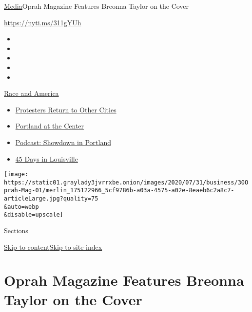 \href{/section/business/media}{Media}\textbar{}Oprah Magazine Features
Breonna Taylor on the Cover

\url{https://nyti.ms/311gYUh}

\begin{itemize}
\item
\item
\item
\item
\item
\end{itemize}

\href{https://www.nytimes3xbfgragh.onion/news-event/george-floyd-protests-minneapolis-new-york-los-angeles?action=click\&pgtype=Article\&state=default\&region=TOP_BANNER\&context=storylines_menu}{Race
and America}

\begin{itemize}
\tightlist
\item
  \href{https://www.nytimes3xbfgragh.onion/2020/07/26/us/protests-portland-seattle-trump.html?action=click\&pgtype=Article\&state=default\&region=TOP_BANNER\&context=storylines_menu}{Protesters
  Return to Other Cities}
\item
  \href{https://www.nytimes3xbfgragh.onion/2020/07/24/us/portland-oregon-protests-white-race.html?action=click\&pgtype=Article\&state=default\&region=TOP_BANNER\&context=storylines_menu}{Portland
  at the Center}
\item
  \href{https://www.nytimes3xbfgragh.onion/2020/07/23/podcasts/the-daily/portland-protests.html?action=click\&pgtype=Article\&state=default\&region=TOP_BANNER\&context=storylines_menu}{Podcast:
  Showdown in Portland}
\item
  \href{https://www.nytimes3xbfgragh.onion/interactive/2020/07/16/us/black-lives-matter-protests-louisville-breonna-taylor.html?action=click\&pgtype=Article\&state=default\&region=TOP_BANNER\&context=storylines_menu}{45
  Days in Louisville}
\end{itemize}

\texttt{[image: https://static01.graylady3jvrrxbe.onion/images/2020/07/31/business/30Oprah-Mag-01/merlin\_175122966\_5cf9786b-a03a-4575-a02e-8eaeb6c2a8c7-articleLarge.jpg?quality=75\\\&auto=webp\\\&disable=upscale]}

Sections

\protect\hyperlink{site-content}{Skip to
content}\protect\hyperlink{site-index}{Skip to site index}

\hypertarget{oprah-magazine-features-breonna-taylor-on-the-cover}{%
\section{Oprah Magazine Features Breonna Taylor on the
Cover}\label{oprah-magazine-features-breonna-taylor-on-the-cover}}

